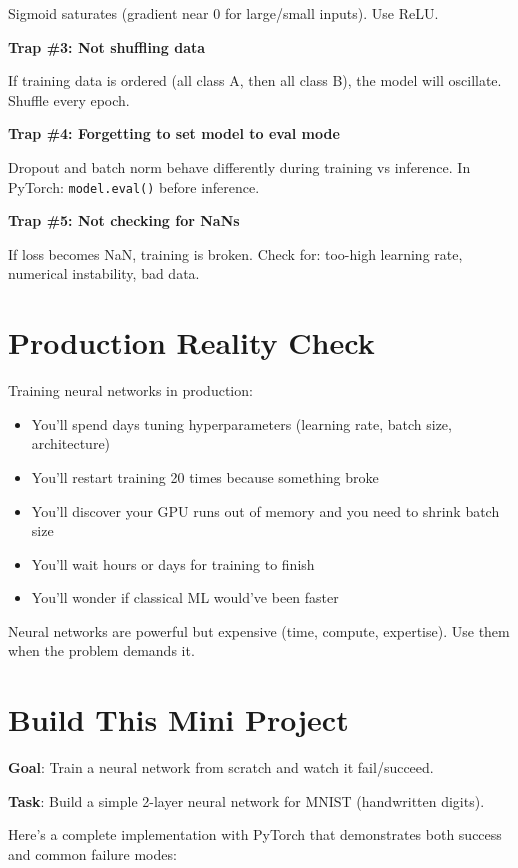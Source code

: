\documentclass[11pt,oneside]{book}
\begin{document}
Sigmoid saturates (gradient near 0 for large/small inputs). Use ReLU.

\textbf{Trap \#3: Not shuffling data}

If training data is ordered (all class A, then all class B), the model will oscillate. Shuffle every epoch.

\textbf{Trap \#4: Forgetting to set model to eval mode}

Dropout and batch norm behave differently during training vs inference. In PyTorch: \texttt{model.eval()} before inference.

\textbf{Trap \#5: Not checking for NaNs}

If loss becomes NaN, training is broken. Check for: too-high learning rate, numerical instability, bad data.

\section{Production Reality Check}

Training neural networks in production:

\begin{itemize}
\item You'll spend days tuning hyperparameters (learning rate, batch size, architecture)
\item You'll restart training 20 times because something broke
\item You'll discover your GPU runs out of memory and you need to shrink batch size
\item You'll wait hours or days for training to finish
\item You'll wonder if classical ML would've been faster
\end{itemize}

Neural networks are powerful but expensive (time, compute, expertise). Use them when the problem demands it.

\section{Build This Mini Project}

\textbf{Goal}: Train a neural network from scratch and watch it fail/succeed.

\textbf{Task}: Build a simple 2-layer neural network for MNIST (handwritten digits).

Here's a complete implementation with PyTorch that demonstrates both success and common failure modes:
\end{document}
